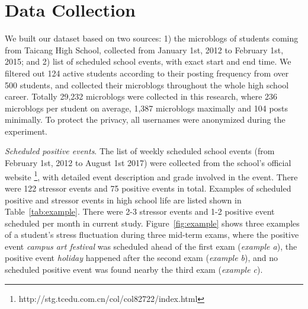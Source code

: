 \section{Data Collection}
\label{sec:study1}
We built our dataset based on two sources: 1) the microblogs of students coming from Taicang High School,
collected from January 1st, 2012 to February 1st, 2015;
and 2) list of scheduled school events, with exact start and end time.
We filtered out 124 active students according to their posting frequency from over 500 students,
and collected their microblogs throughout the whole high school career.
Totally 29,232 microblogs were collected in this research,
where 236 microblogs per student on average, 1,387 microblogs maximally and 104 posts minimally.
To protect the privacy, all usernames were anonymized during the experiment.

\begin{table}[H]
\caption{\small{Examples of school scheduled positive and stressor events.}}
\label{tab:example}
\end{table}

\emph{Scheduled positive events}.
The list of weekly scheduled school events (from February 1st, 2012 to August 1st 2017) were collected from the school's official website
\footnote{http://stg.tcedu.com.cn/col/col82722/index.html},
with detailed event description and grade involved in the event.
There were 122 stressor events and 75 positive events in total.
Examples of scheduled positive and stressor events in high school life are listed shown in Table~\ref{tab:example}.
There were 2-3 stressor events and 1-2 positive event scheduled per month in current study.
Figure~\ref{fig:example} shows three examples of a student's stress fluctuation during three mid-term exams,
where the positive event \emph{campus art festival} was scheduled ahead of the first exam (\emph{example a}),
the positive event \emph{holiday} happened after the second exam (\emph{example b}),
and no scheduled positive event was found nearby the third exam (\emph{example c}). 

